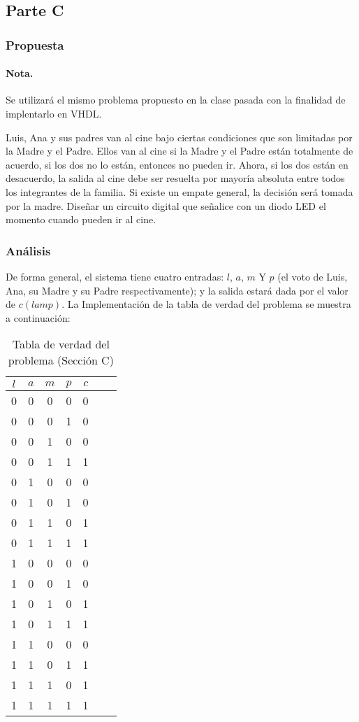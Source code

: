 \documentclass[../procedimientos.tex]{subfiles}
\begin{document}
\clearpage
\subsection{Parte C}
\subsubsection{Propuesta}
\paragraph{Nota.} Se utilizará el mismo problema propuesto en la clase pasada 
con la finalidad de implentarlo en VHDL.

\begin{em}
  Luis, Ana y sus padres van al cine bajo ciertas condiciones que son limitadas 
  por la Madre y el Padre.  Ellos van al cine si la Madre y el Padre están 
  totalmente de acuerdo, si los dos no lo están, entonces no pueden ir.  Ahora, 
  si los dos están en desacuerdo, la salida al cine debe ser resuelta por 
  mayoría absoluta entre todos los integrantes de la familia.  Si existe un 
  empate general, la decisión será tomada por la madre.  Diseñar un circuito 
  digital que señalice con un diodo LED el momento cuando pueden ir al cine.
\end{em}

\subsubsection{Análisis}
De forma general, el sistema tiene cuatro entradas: $l$, $a$, $m$ Y $p$ (el 
voto de Luis, Ana, su Madre y su Padre respectivamente); y la salida estará 
dada por el valor de $c(lamp)$.  La Implementación de la tabla de verdad del 
problema se muestra a continuación:
\begin{table}[H]
  \centering
  \begin{tabular}{cccc|ccc}
    \hline
    $l$ & $a$ & $m$ & $p$ & $c$\\
    \hline
    0 & 0 & 0 & 0 & 0\\
    0 & 0 & 0 & 1 & 0\\
    0 & 0 & 1 & 0 & 0\\
    0 & 0 & 1 & 1 & 1\\
    0 & 1 & 0 & 0 & 0\\
    0 & 1 & 0 & 1 & 0\\
    0 & 1 & 1 & 0 & 1\\
    0 & 1 & 1 & 1 & 1\\
    1 & 0 & 0 & 0 & 0\\
    1 & 0 & 0 & 1 & 0\\
    1 & 0 & 1 & 0 & 1\\
    1 & 0 & 1 & 1 & 1\\
    1 & 1 & 0 & 0 & 0\\
    1 & 1 & 0 & 1 & 1\\
    1 & 1 & 1 & 0 & 1\\
    1 & 1 & 1 & 1 & 1\\
    \hline
  \end{tabular}
  \caption{Tabla de verdad del problema (Sección C)}
  \label{tab:tv_c}
\end{table}
\end{document}
